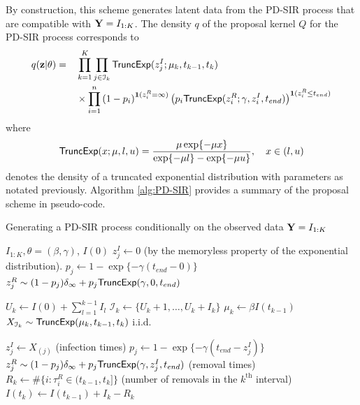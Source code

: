 \documentclass[11pt]{article}
\begin{document}
	By construction, this scheme generates latent data from the PD-SIR process that are compatible with $\mathbf{Y} = I_{1:K}$. The density $q$ of the proposal kernel $Q$ for the PD-SIR process corresponds to
	\begin{alignat}{3}
	\label{eq:q}
		q(\mathbf{z}|\theta) 
		& = && \prod_{k=1}^K \prod_{j\in\mathcal{I}_k} \textsf{TruncExp}(z^I_j; \mu_{k}, t_{k-1}, t_{k}) \\
		& && \times \prod_{i=1}^{n} \left( 1 - p_i \right)^{\mathbf{1}(z^R_i = \infty)} \left( p_i \textsf{TruncExp}(z^R_i; \gamma, z^I_i, t_{end}) \right)^{\mathbf{1}(z^R_i \le t_{end})}
	\end{alignat}
	where %
	$$\textsf{TruncExp}(x; \mu, l, u) = \dfrac{\mu \exp\{-\mu x\}}{\exp\{-\mu l\} - \exp\{-\mu u\}}, \quad x \in (l, u)$$
	denotes the density of a truncated exponential distribution with parameters as notated previously. Algorithm \ref{alg:PD-SIR} provides a summary of the proposal scheme in pseudo-code.
	
	\begin{algorithm}
		\caption{Generating a PD-SIR process conditionally on the observed data $\mathbf{Y} = I_{1:K}$}
		\label{alg:PD-SIR}
		\begin{algorithmic}
			\REQUIRE $I_{1:K}, \theta = (\beta, \gamma)$, $I(0)$
    			\STATE $z^I_j \leftarrow 0$ (by the memoryless property of the exponential distribution).
    			\STATE $p_j \leftarrow 1 - \exp\{-\gamma (t_{end} - 0)\}$
    			\STATE $z^R_j \sim (1 - p_j) \delta_\infty + p_j \textsf{TruncExp}(\gamma, 0, t_{end})$
			\ENDFOR
			
    			\STATE $U_k \leftarrow I(0) + \sum_{l=1}^{k-1} I_l$
    			\STATE $\mathcal{I}_k \leftarrow \{U_k + 1, \dots, U_k + I_k\}$
    			\STATE $\mu_k \leftarrow \beta I(t_{k-1})$
    			\STATE $X_{\mathcal{I}_k} \sim \textsf{TruncExp}(\mu_k, t_{k-1}, t_k)$ i.i.d.\
    			
        			\STATE $z^I_j \leftarrow X_{(j)}$ (infection times)
        			\STATE $p_j \leftarrow 1 - \exp\{-\gamma(t_{end} - z^I_j)\}$
        			\STATE $z^R_j \sim (1 - p_j) \delta_\infty + p_j \textsf{TruncExp}(\gamma, z^I_j, t_{end})$ (removal times)
    			\ENDFOR
    			\STATE $R_k \leftarrow \#\{i:\tau^R_i \in (t_{k-1}, t_k]\}$ (number of removals in the $k^{\text{th}}$ interval)
    			\STATE $I(t_k) \leftarrow I(t_{k-1}) + I_k - R_k$
			\ENDFOR
		\end{algorithmic}
	\end{algorithm}
	
\end{document}
